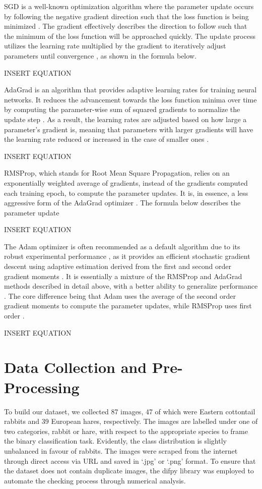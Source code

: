 \documentclass{article}
\begin{document}
SGD is a well-known optimization algorithm where the parameter update occurs by following the negative gradient direction such that the loss function is being minimized \cite{8862686,cs231n}. The gradient effectively describes the direction to follow such that the minimum of the loss function will be approached quickly. The update process utilizes the learning rate multiplied by the gradient to iteratively adjust parameters until convergence \cite{8862686}, as shown in the formula below.
	
	INSERT EQUATION

AdaGrad is an algorithm that provides adaptive learning rates for training neural networks. It reduces the advancement towards the loss function minima over time by computing the parameter-wise sum of squared gradients to normalize the update step \cite{8862686,cs231n}. As a result, the learning rates are adjusted based on how large a parameter’s gradient is, meaning that parameters with larger gradients will have the learning rate reduced or increased in the case of smaller ones \cite{cs231n}. 
	
	INSERT EQUATION

RMSProp, which stands for Root Mean Square Propagation, relies on an exponentially weighted average of gradients, instead of the gradients computed each training epoch, to compute the parameter updates. It is, in essence, a less aggressive form of the AdaGrad optimizer \cite{8862686,cs231n}. The formula below describes the parameter update
		
		INSERT EQUATION

The Adam optimizer is often recommended as a default algorithm due to its robust experimental performance \cite{cs231n}, as it provides an efficient stochastic gradient descent using adaptive estimation derived from the first and second order gradient moments \cite{cs231n}. It is essentially a mixture of the RMSProp and AdaGrad methods described in detail above, with a better ability to generalize performance \cite{cs231n,ajagekar_2021}. The core difference being that Adam uses the average of the second order gradient moments to compute the parameter updates, while RMSProp uses first order \cite{ajagekar_2021}.
		
		INSERT EQUATION


\section{Data Collection and Pre-Processing}
To build our dataset, we collected 87 images, 47 of which were Eastern cottontail rabbits and 39 European hares, respectively. The images are labelled under one of two categories, rabbit or hare, with respect to the appropriate species to frame the binary classification task. Evidently, the class distribution is slightly unbalanced in favour of rabbits. The images were scraped from the internet through direct access via URL and saved in ‘.jpg’ or ‘.png’ format. To ensure that the dataset does not contain duplicate images, the difpy \cite{landman} library was employed to automate the checking process through numerical analysis. 
\end{document}
